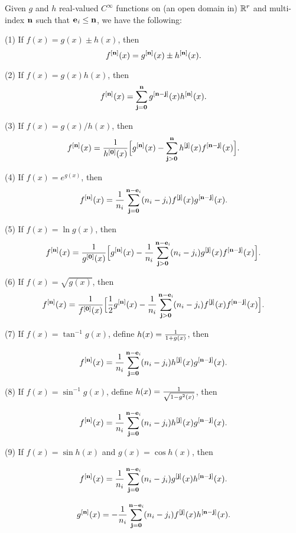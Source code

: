 \documentclass[11pt]{article}
\begin{document}
\begin{proposition}
Given $g$ and $h$ real-valued $C^\infty$ functions on (an open domain in) $\mathbb{R}^r$
and multi-index $\bf n$ such that ${\bf e}_{\it i}\leq\bf n$,
we have the following:

\item{(1)} If $f(x)=g(x)\pm h(x)$, then 
    $$f^{[{\bf n}]}(x) = g^{[{\bf n}]}(x)\pm h^{[{\bf n}]}(x).$$

\item{(2)} If $f(x)=g(x)h(x)$, then 
    $$f^{[{\bf n}]}(x) = \sum_{\bf j={\bf 0}}^{\bf n}
        g^{[{\bf n}-{\bf j}]}(x) h^{[{\bf n}]}(x). $$

\item{(3)} If $f(x)=g(x)/h(x)$, then 
    $$f^{[{\bf n}]}(x) = {1\over h^{[{\bf 0}]}(x)}
        \Bigl[ g^{[{\bf n}]}(x) -
            \sum_{{\bf j}>{\bf 0}}^{\bf n}  h^{[{\bf j}]}(x)  f^{[{\bf n}-{\bf j}]}(x)
        \Bigr].$$ 

\item{(4)} If $f(x)=e^{g(x)}$, then 
    $$ f^{[{\bf n}]}(x) = {1\over n_i} 
        \sum_{{\bf j}={\bf 0}}^{{\bf n}-{\bf e}_i}
            (n_i-j_i) f^{[{\bf j}]}(x) g^{[{\bf n}-{\bf j}]}(x).
$$

\item{(5)} If $f(x)=\ln g(x)$, then 
$$ f^{[{\bf n}]}(x) = {
    1\over g^{[\bf 0]}(x)} 
        \Bigl[ g^{[{\bf n}]}(x) -
            {1 \over n_i}
            \sum_{ {\bf j}>{\bf 0} }^{{\bf n}-{{\bf e}_{\it i}} }
                (n_i-j_i) g^{[{\bf j}]}(x) f^{[{\bf n}-{\bf j}]}(x)
        \Bigr].
$$

\item{(6)} If $f(x)=\sqrt{g(x)}$, then 
$$ f^{[{\bf n}]}(x) = {
    1\over f^{[\bf 0]}(x)} 
        \Bigl[ {1\over 2}g^{[{\bf n}]}(x) -
            {1 \over n_i}
            \sum_{ {\bf j}>{\bf 0} }^{{\bf n}-{{\bf e}_{\it i}} }
                (n_i-j_i) f^{[{\bf j}]}(x) f^{[{\bf n}-{\bf j}]}(x)
        \Bigr].
$$

\item{(7)} If $f(x)=\tan^{-1}{g(x)}$, 
define $h(x)={1\over 1+g(x)}$, then

$$ 
    f^{[\bf n]}(x) = {1\over n_i} \sum_{\bf j=\bf 0}^{\bf n-{\bf e}_{\it i}}
        (n_i - j_i) h^{[\bf j]}(x) g^{[\bf n-\bf j]}(x).
$$

\item{(8)} If $f(x)=\sin^{-1}{g(x)}$,
define $h(x)={1\over \sqrt{1-g^2(x)}}$, then

$$ 
    f^{[\bf n]}(x) = {1\over n_i} \sum_{\bf j=\bf 0}^{\bf n-{\bf e}_{\it i}}
        (n_i - j_i) h^{[\bf j]}(x) g^{[\bf n-\bf j]}(x).
$$


\item{(9)} If $f(x)=\sin{h(x)}$ and $g(x)=\cos{h(x)}$, then

$$ 
    f^{[\bf n]}(x) = {1\over n_i} \sum_{\bf j=\bf 0}^{\bf n-{\bf e}_{\it i}}
        (n_i - j_i) g^{[\bf j]}(x) h^{[\bf n-\bf j]}(x).
$$

$$ 
    g^{[\bf n]}(x) = -{1\over n_i} \sum_{\bf j=\bf 0}^{\bf n-{\bf e}_{\it i}}
        (n_i - j_i) f^{[\bf j]}(x) h^{[\bf n-\bf j]}(x).
$$


\end{proposition}
\end{document}
